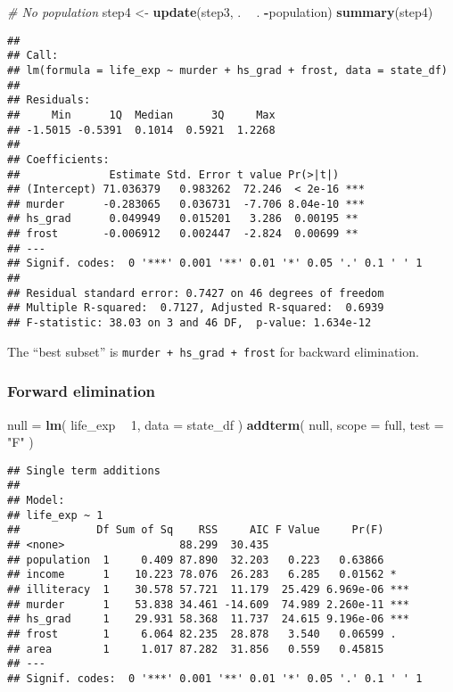 \documentclass[]{article}
\newenvironment{Shaded}{\begin{snugshade}}{\end{snugshade}}
\newcommand{\CommentTok}[1]{\textcolor[rgb]{0.56,0.35,0.01}{\textit{#1}}}
\newcommand{\DataTypeTok}[1]{\textcolor[rgb]{0.13,0.29,0.53}{#1}}
\newcommand{\DecValTok}[1]{\textcolor[rgb]{0.00,0.00,0.81}{#1}}
\newcommand{\KeywordTok}[1]{\textcolor[rgb]{0.13,0.29,0.53}{\textbf{#1}}}
\newcommand{\NormalTok}[1]{#1}
\newcommand{\OperatorTok}[1]{\textcolor[rgb]{0.81,0.36,0.00}{\textbf{#1}}}
\newcommand{\StringTok}[1]{\textcolor[rgb]{0.31,0.60,0.02}{#1}}
\begin{document}
\begin{Shaded}
\begin{Highlighting}[]
\CommentTok{# No population}
\NormalTok{step4 <-}\StringTok{ }\KeywordTok{update}\NormalTok{(step3, . }\OperatorTok{~}\StringTok{ }\NormalTok{. }\OperatorTok{-}\NormalTok{population)}
\KeywordTok{summary}\NormalTok{(step4)}
\end{Highlighting}
\end{Shaded}

\begin{verbatim}
## 
## Call:
## lm(formula = life_exp ~ murder + hs_grad + frost, data = state_df)
## 
## Residuals:
##     Min      1Q  Median      3Q     Max 
## -1.5015 -0.5391  0.1014  0.5921  1.2268 
## 
## Coefficients:
##              Estimate Std. Error t value Pr(>|t|)    
## (Intercept) 71.036379   0.983262  72.246  < 2e-16 ***
## murder      -0.283065   0.036731  -7.706 8.04e-10 ***
## hs_grad      0.049949   0.015201   3.286  0.00195 ** 
## frost       -0.006912   0.002447  -2.824  0.00699 ** 
## ---
## Signif. codes:  0 '***' 0.001 '**' 0.01 '*' 0.05 '.' 0.1 ' ' 1
## 
## Residual standard error: 0.7427 on 46 degrees of freedom
## Multiple R-squared:  0.7127, Adjusted R-squared:  0.6939 
## F-statistic: 38.03 on 3 and 46 DF,  p-value: 1.634e-12
\end{verbatim}

The ``best subset'' is \texttt{murder\ +\ hs\_grad\ +\ frost} for
backward elimination.

\hypertarget{forward-elimination}{%
\subsubsection{Forward elimination}\label{forward-elimination}}

\begin{Shaded}
\begin{Highlighting}[]
\NormalTok{null =}\StringTok{ }\KeywordTok{lm}\NormalTok{( life_exp }\OperatorTok{~}\StringTok{ }\DecValTok{1}\NormalTok{, }\DataTypeTok{data =}\NormalTok{ state_df )}
\KeywordTok{addterm}\NormalTok{( null, }\DataTypeTok{scope =}\NormalTok{ full, }\DataTypeTok{test =} \StringTok{"F"}\NormalTok{ )}
\end{Highlighting}
\end{Shaded}

\begin{verbatim}
## Single term additions
## 
## Model:
## life_exp ~ 1
##            Df Sum of Sq    RSS     AIC F Value     Pr(F)    
## <none>                  88.299  30.435                      
## population  1     0.409 87.890  32.203   0.223   0.63866    
## income      1    10.223 78.076  26.283   6.285   0.01562 *  
## illiteracy  1    30.578 57.721  11.179  25.429 6.969e-06 ***
## murder      1    53.838 34.461 -14.609  74.989 2.260e-11 ***
## hs_grad     1    29.931 58.368  11.737  24.615 9.196e-06 ***
## frost       1     6.064 82.235  28.878   3.540   0.06599 .  
## area        1     1.017 87.282  31.856   0.559   0.45815    
## ---
## Signif. codes:  0 '***' 0.001 '**' 0.01 '*' 0.05 '.' 0.1 ' ' 1
\end{verbatim}
\end{document}
